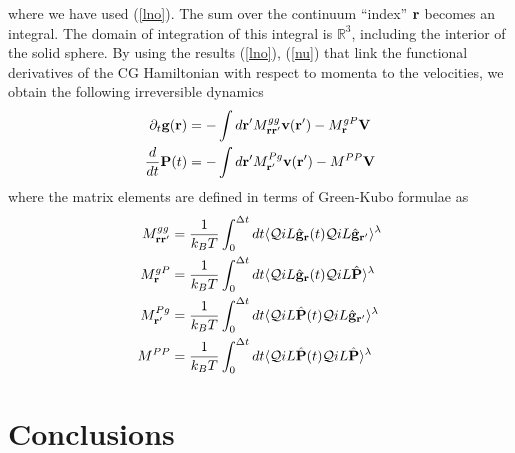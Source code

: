 \documentclass[a4paper,openright,12pt]{book}
\begin{document}
where we have  used (\ref{lno}). The sum over  the continuum ``index''
${\bf  r}$ becomes  an integral.   The domain  of integration  of this
integral  is  $\mathbb{R}^3$,  including  the interior  of  the  solid
sphere. By  using the  results (\ref{lno}),  (\ref{nu}) that  link the
functional derivatives of  the CG Hamiltonian with  respect to momenta
to the velocities, we obtain the following irreversible dynamics
\begin{align}
  \partial_t{\bf g}({\bf r})&=-\int d{\bf r}'M^{gg}_{{\bf r}{\bf r}'}
{\bf v}({\bf r}')-M^{gP}_{\bf r}{\bf V}
\nonumber\\
\frac{d}{dt}{\bf P}(t)&=-\int d{\bf r}' M^{Pg}_{{\bf r}'}{\bf v}({\bf r}')-M^{PP}{\bf V}
\label{IrrMark1}\end{align}
where the matrix elements are  defined in terms of Green-Kubo formulae
as
\begin{align}
  M^{gg}_{{\bf r}{\bf r}'}&=\frac{1}{k_BT}\int_0^{\Delta t} dt\langle 
{\cal Q}  iL\hat{\bf g}_{{\bf r}}(t){\cal Q}  iL\hat{\bf g}_{{\bf r}'}\rangle^\lambda
\nonumber\\
  M^{gP}_{{\bf r}}&=\frac{1}{k_BT}\int_0^{\Delta t} dt\langle 
{\cal Q}  iL\hat{\bf g}_{\bf r}(t){\cal Q}  iL\hat{\bf P}\rangle^\lambda
\nonumber\\
  M^{Pg}_{{\bf r}'}&=\frac{1}{k_BT}\int_0^{\Delta t} dt\langle 
{\cal Q}  iL\hat{\bf P}(t){\cal Q}  iL\hat{\bf g}_{{\bf r}'}\rangle^\lambda
\nonumber\\
  M^{PP}&=\frac{1}{k_BT}\int_0^{\Delta t} dt\langle 
{\cal Q}  iL\hat{\bf P}(t){\cal Q}  iL\hat{\bf P}\rangle^\lambda
\nonumber\\
\label{Ms}
\end{align}





\section{Conclusions}

\end{document}
